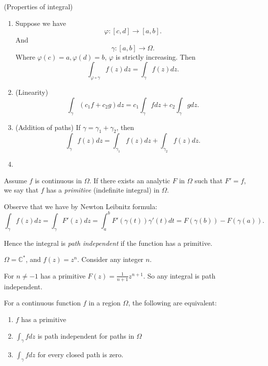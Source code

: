 \begin{proposition}(Properties of integral)
	\begin{enumerate}
		\item Suppose we have 
			\[
				\varphi: [c,d] \to  [a,b]
			.\] 
			And \[
				\gamma: [a,b] \to  \Omega
			.\] 
		Where $\varphi(c) = a, \varphi(d) = b$, $\varphi$ is strictly increasing. Then
		\[
			\int_{\varphi\circ\gamma}f(z) dz = \int_\gamma f(z) dz
		.\] 
	\item (Linearity)
		\[
		\int _\gamma (c_1f + c_2g)dz 
		=c_1 \int_\gamma fdz + c_2 \int _\gamma g dz 
		.\] 
	\item (Addition of paths)
		If $\gamma = \gamma_1 + \gamma_2$, then
		\[
		\int _\gamma f(z) dz
		= \int _{\gamma_1} f(z) dz
		+ \int _{\gamma_2} f(z) dz
		.\] 
	\item 
	\end{enumerate}
\end{proposition}

\begin{definition}
	Assume $f$ is continuous in $\Omega$. If there exists an analytic $F$ in $\Omega$ such that $F' = f$, we say that $f$ has a \textit{primitive} (indefinite integral) in $\Omega$.
\end{definition}

Observe that we have by Newton Leibnitz formula: \[
	\int _\gamma f(z) dz = \int _\gamma F'(z) dz = \int _a^b F'(\gamma(t))\gamma'(t) dt = F(\gamma(b)) - F(\gamma(a))
.\] 

Hence the integral is \textit{path independent} if the function has a primitive.

\begin{example}
	$\Omega = \mathbb{C}^*$, and $f(z) = z^n$. Consider any integer $n$.

	For $n \neq  -1$ has a primitive $F(z) = \frac{1}{n+1}z^{n+1}$. So any integral is path independent.	
\end{example}

\begin{theorem}
	For a continuous function $f$ in a region $\Omega$, the following are equivalent:
	\begin{enumerate}
		\item $f$ has a primitive
		\item $\int _\gamma f dz$ is path independent for paths in $\Omega$
		\item $\int _\gamma f dz$ for every closed path is zero.
	\end{enumerate}
\end{theorem}

